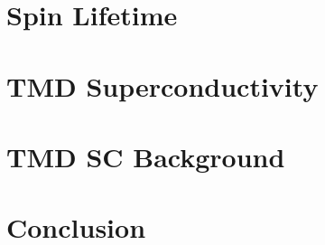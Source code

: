 \documentclass[oneside,12pt]{memoir}
\begin{document}
  \frontmatter{}
  
  
  
  \pagestyle{thesis}
  
  
  
  \newpage
  \tableofcontents
  \newpage
  \listoffigures
  \mainmatter{}
  

  \chapter{Spin Lifetime}
  
  
  
  
  

  \chapter{TMD Superconductivity}
  
  
  
  
  

  \chapter{TMD SC Background}
  
  
  
  
  
  
  
  

  \chapter{Conclusion}
  
  \backmatter{}
  \SingleSpacing{}
  \printbibliography{}
\end{document}
